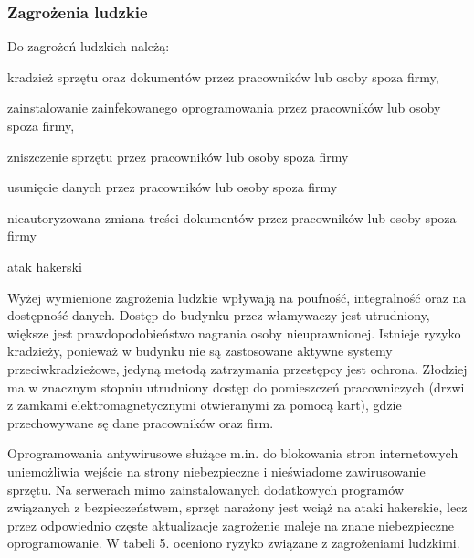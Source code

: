 \subsubsection{Zagrożenia ludzkie}
Do zagrożeń ludzkich należą: 
\begin{itemize*}
	\item kradzież sprzętu oraz dokumentów przez pracowników lub osoby spoza firmy,
	\item zainstalowanie zainfekowanego oprogramowania przez pracowników lub osoby spoza firmy,
	\item zniszczenie sprzętu przez pracowników lub osoby spoza firmy
	\item usunięcie danych przez pracowników lub osoby spoza firmy
	\item nieautoryzowana zmiana treści dokumentów przez pracowników lub osoby spoza firmy
	\item atak hakerski 
\end{itemize*}

Wyżej wymienione zagrożenia ludzkie wpływają na poufność, integralność oraz na dostępność danych. Dostęp do budynku przez włamywaczy jest utrudniony, większe jest prawdopodobieństwo nagrania osoby nieuprawnionej. Istnieje ryzyko kradzieży, ponieważ w budynku nie są zastosowane aktywne systemy przeciwkradzieżowe, jedyną metodą zatrzymania przestępcy jest ochrona. Złodziej ma w znacznym stopniu utrudniony dostęp do pomieszczeń pracowniczych (drzwi z zamkami elektromagnetycznymi otwieranymi za pomocą kart), gdzie przechowywane sę dane pracowników oraz firm. 

 Oprogramowania antywirusowe służące m.in. do blokowania stron internetowych uniemożliwia wejście na strony niebezpieczne i nieświadome zawirusowanie sprzętu. Na serwerach mimo zainstalowanych dodatkowych programów związanych z bezpieczeństwem, sprzęt narażony jest wciąż na ataki hakerskie, lecz przez odpowiednio częste aktualizacje zagrożenie maleje na znane niebezpieczne oprogramowanie.
W tabeli 5. oceniono ryzyko związane z zagrożeniami ludzkimi.

